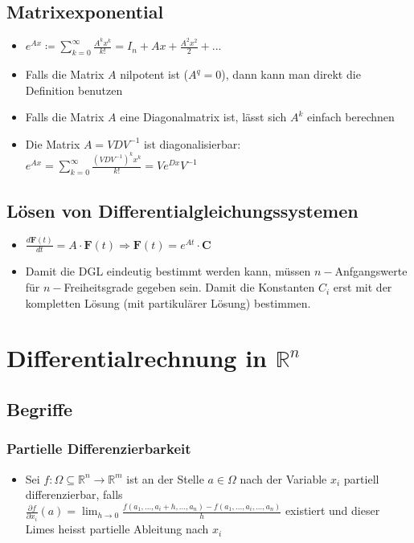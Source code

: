 \documentclass[a3paper, 11pt, landscape]{scrartcl}
\newcommand{\Rn}{\mathbb{R}^n}
\newcommand{\fOmegaRnRm}{f:\Omega \subseteq\Rn\to\mathbb{R}^m}
\begin{document}
\begin{multicols*}{3}
	\subsection{Matrixexponential}
	\begin{itemize}
	    \item $e^{Ax}\coloneqq \sum_{k=0}^{\infty} \frac{A^kx^k}{k!} = I_n + Ax + \frac{A^2x^2}{2}+...$
	    \item Falls die Matrix $A$ nilpotent ist ($A^q=0$), dann kann man direkt die Definition benutzen
	    \item Falls die Matrix $A$ eine Diagonalmatrix ist, lässt sich $A^k$ einfach berechnen
	    \item Die Matrix $A=VDV^{-1}$ ist diagonalisierbar: \\
	    $e^{Ax} = \sum_{k=0}^{\infty} \frac{(VDV^{-1})^k x^k}{k!} = Ve^{Dx}V^{-1}$
	\end{itemize}
	\subsection{Lösen von Differentialgleichungssystemen}
	\begin{itemize}
	    \item $\frac{d\textbf{F}(t)}{dt} = A \cdot \textbf{F}(t) \Rightarrow \textbf{F}(t) = e^{At} \cdot \textbf{C}$
	    \item Damit die DGL eindeutig bestimmt werden kann, müssen $n-$Anfgangswerte für $n-$Freiheitsgrade gegeben sein. Damit die Konstanten $C_i$ erst mit der kompletten Lösung (mit partikulärer Lösung) bestimmen.
	\end{itemize}
	
	
	
	\section{Differentialrechnung in $\Rn$}
    \subsection{Begriffe}
    \subsubsection{Partielle Differenzierbarkeit}
    \begin{itemize}
        \item Sei $\fOmegaRnRm$ ist an der Stelle $a\in \Omega$ nach der Variable $x_i$ partiell differenzierbar, falls\\
        $\frac{\partial f}{\partial x_i}(a)=\lim_{h\to 0} \frac{f(a_1,...,a_i+h,...,a_n)-f(a_1,...,a_i,...,a_n)}{h}$ existiert und dieser Limes heisst partielle Ableitung nach $x_i$
    \end{itemize}
    

\end{multicols*}
\end{document}
